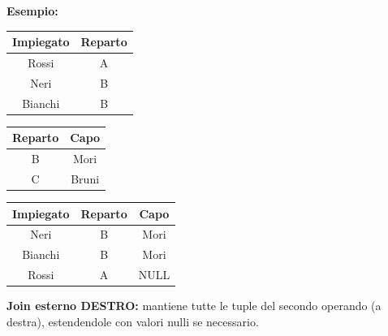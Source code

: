 \documentclass{article}
\begin{document}
\begin{itemize}
{    
\textbf{Esempio:}

\begin{minipage}{.25\textwidth}
  \centering
    \begin{tabular}{|c|c|}
        \hline
        \textbf{Impiegato} & \textbf{Reparto} \\
        \hline
        Rossi & A \\
        \hline
        Neri &  B \\
        \hline
        Bianchi & B \\
         \hline
        \end{tabular}
\end{minipage}%
\hfill
\begin{minipage}{.25\textwidth}
  \centering
       \begin{tabular}{|c|c|}
        \hline
        \textbf{Reparto} & \textbf{Capo} \\
        \hline
        B & Mori\\
        \hline
        C & Bruni\\
         \hline
        \end{tabular}
\end{minipage}
\hfill
\begin{minipage}{.25\textwidth}
  \centering
       \begin{tabular}{|c|c|c|}
        \hline
        \textbf{Impiegato} & \textbf{Reparto} & \textbf{Capo} \\
        \hline
        Neri & B & Mori\\
         \hline
         Bianchi & B & Mori\\
         \hline
        Rossi & A & NULL\\
         \hline
        \end{tabular}
\hspace{1em}
\end{minipage}

\item \textbf{Join esterno DESTRO:} mantiene tutte le tuple del secondo operando (a destra), estendendole con valori nulli se necessario.


}
\end{itemize}
\end{document}
